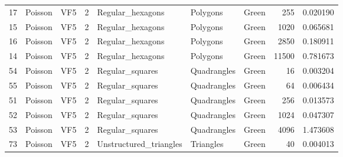 \begin{tabular}{lllrlllrr}
17  &           Poisson &                            VF5 &               2 &                Regular\_hexagons &               Polygons  &                                Green &                      255 &                         0.020190 \\
15  &           Poisson &                            VF5 &               2 &                Regular\_hexagons &               Polygons  &                                Green &                     1020 &                         0.065681 \\
16  &           Poisson &                            VF5 &               2 &                Regular\_hexagons &               Polygons  &                                Green &                     2850 &                         0.180911 \\
14  &           Poisson &                            VF5 &               2 &                Regular\_hexagons &               Polygons  &                                Green &                    11500 &                         0.781673 \\
54  &           Poisson &                            VF5 &               2 &                 Regular\_squares &            Quadrangles  &                                Green &                       16 &                         0.003204 \\
55  &           Poisson &                            VF5 &               2 &                 Regular\_squares &            Quadrangles  &                                Green &                       64 &                         0.006434 \\
51  &           Poisson &                            VF5 &               2 &                 Regular\_squares &            Quadrangles  &                                Green &                      256 &                         0.013573 \\
52  &           Poisson &                            VF5 &               2 &                 Regular\_squares &            Quadrangles  &                                Green &                     1024 &                         0.047307 \\
53  &           Poisson &                            VF5 &               2 &                 Regular\_squares &            Quadrangles  &                                Green &                     4096 &                         1.473608 \\
73  &           Poisson &                            VF5 &               2 &          Unstructured\_triangles &              Triangles  &                                Green &                       40 &                         0.004013 \\

\end{tabular}
